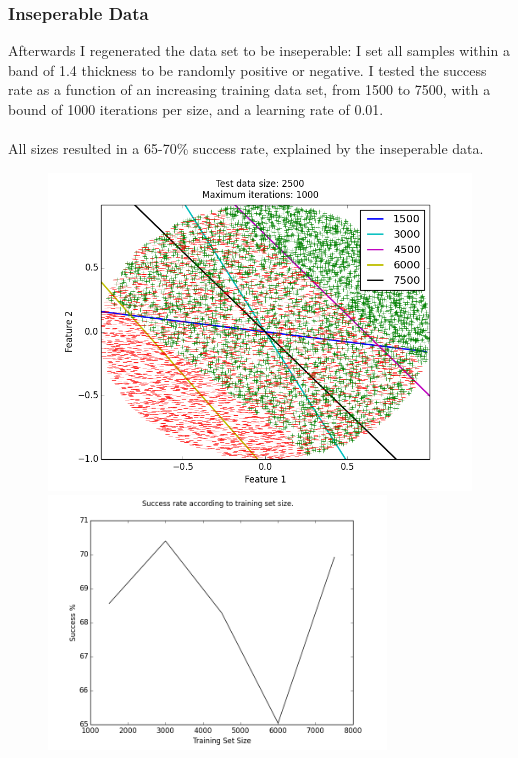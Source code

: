 \documentclass[a4paper]{article}
\begin{document}
\newpage

\subsubsection {Inseperable Data}

Afterwards I regenerated the data set to be inseperable:
I set all samples within a band of 1.4 thickness to be randomly positive
or negative. I tested the success rate as a function of an increasing training
data set, from 1500 to 7500, with a bound of 1000 iterations per size,
and a learning rate of 0.01.
\\\\
All sizes resulted in a 65-70\% success rate, explained by the inseperable data.

\begin{figure}[h!]
    \includegraphics[width=1.0\textwidth]{images/inseperable.png}
    \includegraphics[width=0.8\textwidth]{images/success_rate.png}
\end{figure}
\end{document}

